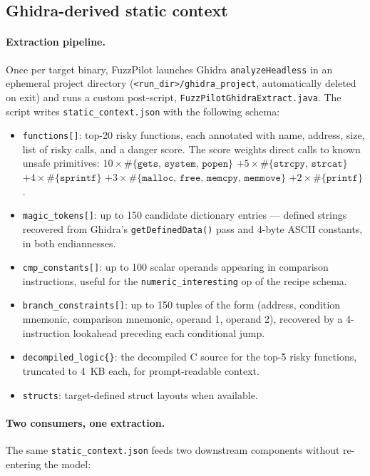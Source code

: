 \documentclass[11pt]{article}
\begin{document}
\subsection{Ghidra-derived static context}
\label{sec:plateau:ghidra}

\paragraph{Extraction pipeline.}
Once per target binary, FuzzPilot launches Ghidra
\texttt{analyzeHeadless} in an ephemeral project directory
(\texttt{<run\_dir>/ghidra\_project}, automatically deleted on
exit) and runs a custom post-script,
\texttt{FuzzPilotGhidraExtract.java}. The script writes
\texttt{static\_context.json} with the following schema:

\begin{itemize}
  \item \texttt{functions[]}: top-20 risky functions, each
  annotated with name, address, size, list of risky calls, and a
  danger score. The score weights direct calls to known unsafe
  primitives:
  $10\times \#\{\texttt{gets},\,\texttt{system},\,\texttt{popen}\}$
  $+ 5\times \#\{\texttt{strcpy},\,\texttt{strcat}\}$
  $+ 4\times \#\{\texttt{sprintf}\}$
  $+ 3\times \#\{\texttt{malloc},\,\texttt{free},\,\texttt{memcpy},\,\texttt{memmove}\}$
  $+ 2\times \#\{\texttt{printf}\}$.
  \item \texttt{magic\_tokens[]}: up to 150 candidate dictionary
  entries --- defined strings recovered from Ghidra's
  \texttt{getDefinedData()} pass and 4-byte ASCII constants, in both
  endiannesses.
  \item \texttt{cmp\_constants[]}: up to 100 scalar operands
  appearing in comparison instructions, useful for the
  \texttt{numeric\_interesting} op of the recipe schema.
  \item \texttt{branch\_constraints[]}: up to 150 tuples of the
  form (address, condition mnemonic, comparison mnemonic,
  operand 1, operand 2), recovered by a 4-instruction lookahead
  preceding each conditional jump.
  \item \texttt{decompiled\_logic\{\}}: the decompiled C source
  for the top-5 risky functions, truncated to 4~KB each, for
  prompt-readable context.
  \item \texttt{structs}: target-defined struct layouts when
  available.
\end{itemize}

\paragraph{Two consumers, one extraction.}
The same \texttt{static\_context.json} feeds two downstream
components without re-entering the model:
\end{document}
